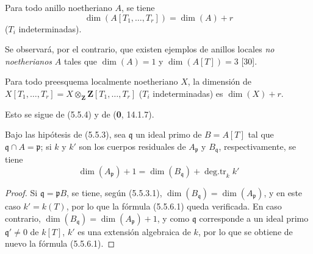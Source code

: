 \begin{corollary}[5.5.4]
Para todo anillo noetheriano $A$, se tiene
\begin{equation}
\dim(A[T_1,\ldots,T_r])=\dim(A)+r
\tag{5.5.4.1}\label{IV.2.s5.5.4.1-fr}
\end{equation}
($T_i$ indeterminadas).
\end{corollary}

Se observará, por el contrario, que existen ejemplos de anillos locales \emph{no
noetherianos} $A$ tales que $\dim(A)=1$ y $\dim(A[T])=3$ [30].

\begin{corollary}[5.5.5]
\label{IV.2.s5.5.5-fr}
Para todo preesquema localmente noetheriano $X$, la dimensión de
$X[T_1,\ldots,T_r]=X\otimes_{\mathbf Z}\mathbf Z[T_1,\ldots,T_r]$
($T_i$ indeterminadas) es $\dim(X)+r$.
\end{corollary}

Esto se sigue de (5.5.4) y de (\textbf 0, 14.1.7).

\begin{corollary}[5.5.6]
\label{IV.2.s5.5.6-fr}
Bajo las hipótesis de \textup{(5.5.3)}, sea $\mathfrak q$ un ideal primo de
$B=A[T]$ tal que $\mathfrak q\cap A=\mathfrak p$; si $k$ y $k'$ son los
cuerpos residuales de $A_{\mathfrak p}$ y $B_{\mathfrak q}$, respectivamente,
se tiene
\begin{equation}
\dim(A_{\mathfrak p})+1
=\dim(B_{\mathfrak q})+\operatorname{deg.tr}_k k'
\tag{5.5.6.1}\label{IV.2.s5.5.6.1-fr}
\end{equation}
\end{corollary}

\begin{proof}

Si $\mathfrak q=\mathfrak pB$, se tiene, según (5.5.3.1),
$\dim(B_{\mathfrak q})=\dim(A_{\mathfrak p})$, y en este caso $k'=k(T)$,
por lo que la fórmula (5.5.6.1) queda verificada. En caso contrario,
$\dim(B_{\mathfrak q})=\dim(A_{\mathfrak p})+1$, y como $\mathfrak q$
corresponde a un ideal primo $\mathfrak q'\ne0$ de $k[T]$, $k'$ es una
extensión algebraica de $k$, por lo que se obtiene de nuevo la fórmula
(5.5.6.1).
\end{proof}

